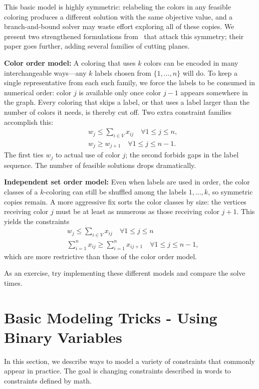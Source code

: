 This basic model is highly symmetric: relabeling the colors in any feasible coloring produces a different solution with the same objective value, and a branch-and-bound solver may waste effort exploring all of these copies.  We present two strengthened formulations from~\cite{MENDEZDIAZ2008159} that attack this symmetry; their paper goes further, adding several families of cutting planes.

\textbf{ Color order model:}
A coloring that uses $k$ colors can be encoded in many interchangeable ways---any $k$ labels chosen from $\{1, \ldots, n\}$ will do.  To keep a single representative from each such family, we force the labels to be consumed in numerical order: color $j$ is available only once color $j-1$ appears somewhere in the graph.  Every coloring that skips a label, or that uses a label larger than the number of colors it needs, is thereby cut off.  Two extra constraint families accomplish this:
$$
\begin{aligned}
& w_j \leq \sum_{i \in V} x_{i j} \quad \forall 1 \leq j \leq n, \\
& w_j \geq w_{j+1} \quad \forall 1 \leq j \leq n-1 .
\end{aligned}
$$
The first ties $w_j$ to actual use of color $j$; the second forbids gaps in the label sequence.  The number of feasible solutions drops dramatically.

\textbf{ Independent set order model:}
Even when labels are used in order, the color classes of a $k$-coloring can still be shuffled among the labels $1, \ldots, k$, so symmetric copies remain.  A more aggressive fix sorts the color classes by size: the vertices receiving color $j$ must be at least as numerous as those receiving color $j+1$.  This yields the constraints
$$
\begin{aligned}
& w_j \leq \sum_{i \in V} x_{i j} \quad \forall 1 \leq j \leq n \\
& \sum_{i=1}^n x_{i j} \geq \sum_{i=1}^n x_{i j+1} \quad \forall 1 \leq j \leq n-1 ,
\end{aligned}
$$
which are more restrictive than those of the color order model.

As an exercise, try implementing these different models and compare the solve times.

\newpage
\section{Basic Modeling Tricks - Using Binary Variables}
\label{sec:modeling-tricks}
In this section, we describe ways to model a variety of constraints that commonly appear in practice.  The goal is changing constraints described in words to constraints defined by math.

